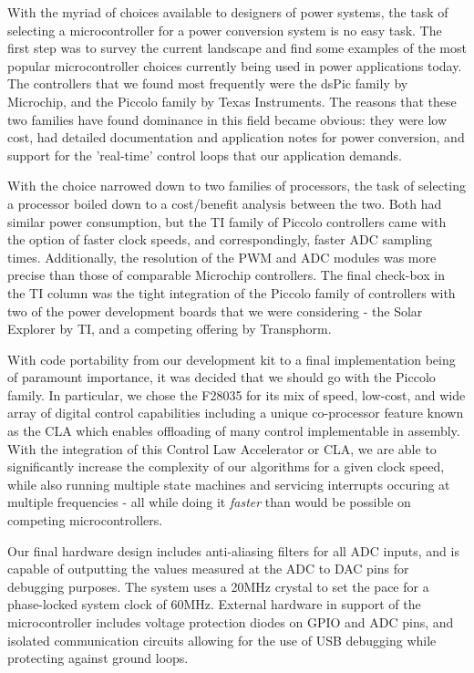 With the myriad of choices available to designers of power systems, the task of selecting a microcontroller for a power conversion system is no easy task. The first step was to survey the current landscape and find some examples of the most popular microcontroller choices currently being used in power applications today. The controllers that we found most frequently were the dsPic family by Microchip, and the Piccolo family by Texas Instruments. The reasons that these two families have found dominance in this field became obvious: they were low cost, had detailed documentation and application notes for power conversion, and support for the 'real-time' control loops that our application demands.

With the choice narrowed down to two families of processors, the task of selecting a processor boiled down to a cost/benefit analysis between the two. Both had similar power consumption, but the TI family of Piccolo controllers came with the option of faster clock speeds, and correspondingly, faster ADC sampling times. Additionally, the resolution of the PWM and ADC modules was more precise than those of comparable Microchip controllers. The final check-box in the TI column was the tight integration of the Piccolo family of controllers with two of the power development boards that we were considering - the Solar Explorer by TI, and a competing offering by Transphorm. 

With code portability from our development kit to a final implementation being of paramount importance, it was decided that we should go with the Piccolo family. In particular, we chose the F28035 for its mix of speed, low-cost, and wide array of digital control capabilities including a unique co-processor feature known as the CLA which enables offloading of many control implementable in assembly. With the integration of this Control Law Accelerator or CLA, we are able to significantly increase the complexity of our algorithms for a given clock speed, while also running multiple state machines and servicing interrupts occuring at multiple frequencies - all while doing it \emph{faster} than would be possible on competing microcontrollers.

Our final hardware design includes anti-aliasing filters for all ADC inputs, and is capable of outputting the values measured at the ADC to DAC pins for debugging purposes. The system uses a 20MHz crystal to set the pace for a phase-locked system clock of 60MHz. External hardware in support of the microcontroller includes voltage protection diodes on GPIO and ADC pins, and isolated communication circuits allowing for the use of USB debugging while protecting against ground loops.

